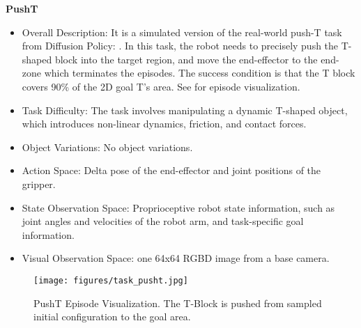 \textbf{PushT}
\begin{itemize}
    \item Overall Description: It is a simulated version of the real-world push-T task from Diffusion Policy: \href{https://diffusion-policy.cs.columbia.edu/}{\color{red}{https://diffusion-policy.cs.columbia.edu/}}. In this task, the robot needs to precisely push the T-shaped block into the target region, and move the end-effector to the end-zone which terminates the episodes. The success condition is that the T block covers 90\% of the 2D goal T's area. See  for episode visualization.
    \item Task Difficulty: The task involves manipulating a dynamic T-shaped object, which introduces non-linear dynamics, friction, and contact forces.
    \item Object Variations: No object variations.
    \item Action Space: Delta pose of the end-effector and joint positions of the gripper.
    \item State Observation Space: Proprioceptive robot state information, such as joint angles and velocities of the robot arm, and task-specific goal information.
    \item Visual Observation Space:
    one 64x64 RGBD image from a base camera.
\end{itemize}
\begin{figure}[!ht]
    \centering
    \texttt{[image: figures/task\_pusht.jpg]}
    \caption{PushT Episode Visualization. The T-Block is pushed from sampled initial configuration to the goal area.}
    \label{fig:task_pusht}
\end{figure}

